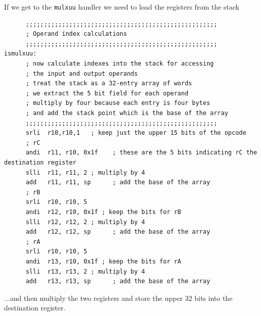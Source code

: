 \documentclass[../notes.tex]{subfiles}
\begin{document}
If we get to the \texttt{mulxuu} handler we need to load the registers from the stack


\begin{listing}[H]
\begin{verbatim}
      ;;;;;;;;;;;;;;;;;;;;;;;;;;;;;;;;;;;;;;;;;;;;;;;;;;;;;
      ; Operand index calculations
      ;;;;;;;;;;;;;;;;;;;;;;;;;;;;;;;;;;;;;;;;;;;;;;;;;;;;;
ismulxuu:
      ; now calculate indexes into the stack for accessing
      ; the input and output operands
      ; treat the stack as a 32-entry array of words
      ; we extract the 5 bit field for each operand
      ; multiply by four because each entry is four bytes
      ; and add the stack point which is the base of the array
      ;;;;;;;;;;;;;;;;;;;;;;;;;;;;;;;;;;;;;;;;;;;;;;;;;;;;;
      srli  r10,r10,1   ; keep just the upper 15 bits of the opcode
      ; rC
      andi  r11, r10, 0x1f    ; these are the 5 bits indicating rC the destination register
      slli  r11, r11, 2 ; multiply by 4
      add   r11, r11, sp      ; add the base of the array
      ; rB
      srli  r10, r10, 5
      andi  r12, r10, 0x1f ; keep the bits for rB
      slli  r12, r12, 2 ; multiply by 4
      add   r12, r12, sp      ; add the base of the array
      ; rA
      srli  r10, r10, 5
      andi  r13, r10, 0x1f ; keep the bits for rA
      slli  r13, r13, 2 ; multiply by 4
      add   r13, r13, sp      ; add the base of the array

\end{verbatim}
\end{listing}


...and then multiply the two registers and store the upper 32 bits into the destination register.
\end{document}
